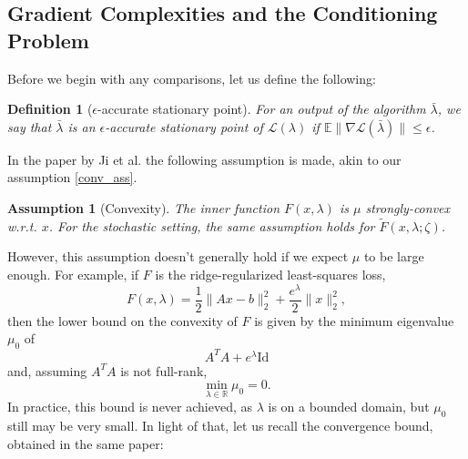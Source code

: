 \documentclass[11pt, twoside]{report}
\newtheorem{definition}[theorem]{Definition}
\newtheorem{assumption}[theorem]{Assumption}
\begin{document}
\subsection{Gradient Complexities and the Conditioning Problem} \label{mu_comp}
Before we begin with any comparisons, let us define the following:
\begin{definition}[$\epsilon$-accurate stationary point]
    For an output of the algorithm $\bar{\lambda}$, we say that $\bar{\lambda}$ is an $\epsilon$-accurate stationary point of $\mathcal{L}(\lambda)$ if $\mathbb{E}\|\nabla\mathcal{L}(\bar{\lambda})\| \leq \epsilon$.
\end{definition}

In the paper by Ji et al. the following assumption is made, akin to our assumption \ref{conv_ass}.

\begin{assumption}[Convexity]
    The inner function $F(x, \lambda)$ is $\mu$ strongly-convex w.r.t. $x$. For the stochastic setting, the same assumption holds for $\tilde{F}(x, \lambda ; \zeta)$.
\end{assumption}

However, this assumption doesn't generally hold if we expect $\mu$ to be large enough. For example, if $F$ is the ridge-regularized least-squares loss,
\[F(x,\lambda) = \frac{1}{2}\|Ax-b\|_2^2 + \frac{e^\lambda}{2}\|x\|_2^2,\]
then the lower bound on the convexity of $F$ is given by the minimum eigenvalue $\mu_0$ of
\[A^T A + e^\lambda \mathrm{Id}\]
and, assuming $A^T A$ is not full-rank,
\[\min_{\lambda \in \mathbb{R}} \mu_0 = 0.\]
In practice, this bound is never achieved, as $\lambda$ is on a bounded domain, but $\mu_0$ still may be very small. In light of that, let us recall the convergence bound, obtained in the same paper:
\end{document}
